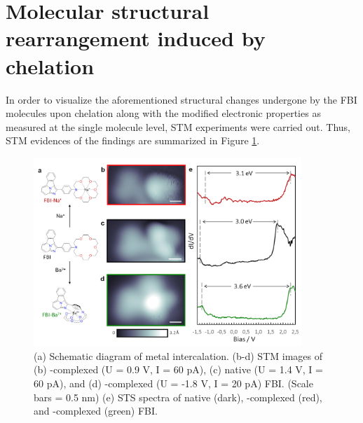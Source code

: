 \documentclass[aps,prl,reprint,longbibliography,superscriptaddress, english]{revtex4-1}
\begin{document}
\section{Molecular structural rearrangement induced by chelation}

In order to visualize the aforementioned structural changes undergone by the FBI molecules upon chelation along with the modified electronic properties as measured at the single molecule level, STM experiments were carried out. Thus, STM evidences of the findings are summarized in Figure \ref{Fig_STS}. 

\begin{figure}[ht!]
	\includegraphics[width=0.9\textwidth]{figures/Fig_STS.png}
	\caption{\label{Fig_STS} 
    (a) Schematic diagram of metal intercalation. (b-d) STM images of (b) \Nap-complexed (U = 0.9 V, I = 60 pA), (c) native (U = 1.4 V, I = 60 pA), and (d) \Bapp-complexed (U = -1.8 V, I = 20 pA) FBI. (Scale bars = 0.5 nm) (e) STS spectra of native (dark), \Nap-complexed (red), and \Bapp-complexed (green) FBI.}
\end{figure}
\end{document}
